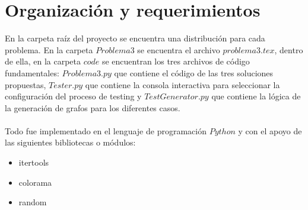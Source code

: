 \documentclass{article}
\begin{document}
\section{Organización y requerimientos}
En la carpeta raíz del proyecto se encuentra una distribución para cada problema. En la carpeta $Problema 3$ se encuentra el archivo $problema3.tex$, dentro de ella, en la carpeta $code$ se encuentran los tres archivos de código fundamentales: $Problema3.py$ que contiene el código de las tres soluciones propuestas, $Tester.py$ que contiene la consola interactiva para seleccionar la configuración del proceso de testing y $TestGenerator.py$ que contiene la lógica de la generación de grafos para los diferentes casos.
\\
\\
Todo fue implementado en el lenguaje de programación $Python$ y con el apoyo de las siguientes bibliotecas o módulos:
\begin{itemize}
    \item itertools
    \item colorama
    \item random
\end{itemize}
\end{document}
